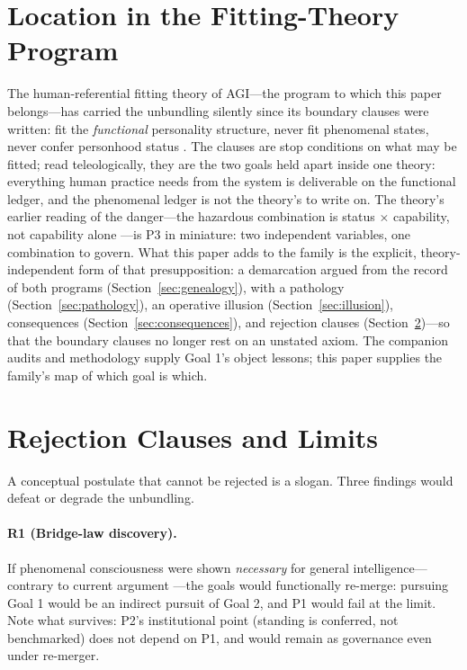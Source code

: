 \documentclass[10pt]{article}
\begin{document}
\section{Location in the Fitting-Theory Program}\label{sec:family}

The human-referential fitting theory of AGI---the program to which this paper belongs---has carried the unbundling silently since its boundary clauses were written: fit the \emph{functional} personality structure, never fit phenomenal states, never confer personhood status \cite{yu2026fitting}. The clauses are stop conditions on what may be fitted; read teleologically, they are the two goals held apart inside one theory: everything human practice needs from the system is deliverable on the functional ledger, and the phenomenal ledger is not the theory's to write on. The theory's earlier reading of the danger---the hazardous combination is status $\times$ capability, not capability alone \cite{yu2026fitting}---is P3 in miniature: two independent variables, one combination to govern. What this paper adds to the family is the explicit, theory-independent form of that presupposition: a demarcation argued from the record of both programs (Section~\ref{sec:genealogy}), with a pathology (Section~\ref{sec:pathology}), an operative illusion (Section~\ref{sec:illusion}), consequences (Section~\ref{sec:consequences}), and rejection clauses (Section~\ref{sec:falsification})---so that the boundary clauses no longer rest on an unstated axiom. The companion audits and methodology \cite{yu2026failureaudit,yu2026methodology} supply Goal 1's object lessons; this paper supplies the family's map of which goal is which.

\section{Rejection Clauses and Limits}\label{sec:falsification}

A conceptual postulate that cannot be rejected is a slogan. Three findings would defeat or degrade the unbundling.

\paragraph{R1 (Bridge-law discovery).} If phenomenal consciousness were shown \emph{necessary} for general intelligence---contrary to current argument \cite{pesonen2026notobstacles}---the goals would functionally re-merge: pursuing Goal 1 would be an indirect pursuit of Goal 2, and P1 would fail at the limit. Note what survives: P2's institutional point (standing is conferred, not benchmarked) does not depend on P1, and would remain as governance even under re-merger.
\end{document}
